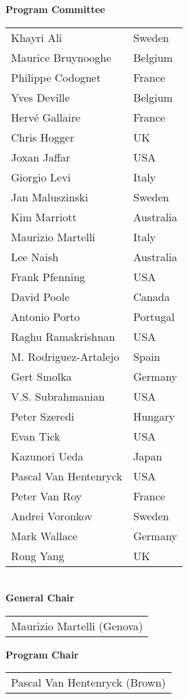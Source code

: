 \parbox{2.3in}{
{\center\bf Program Committee} \\ 
\noindent\begin{tabular}{ll}
Khayri Ali         & Sweden  \\
Maurice Bruynooghe & Belgium \\
Philippe Codognet  & France \\
Yves Deville       & Belgium \\
Herv\'{e} Gallaire & France \\
Chris Hogger       & UK \\
Joxan Jaffar       & USA \\
Giorgio Levi       & Italy \\
Jan Maluszinski    & Sweden \\
Kim Marriott       & Australia \\
Maurizio Martelli  & Italy \\
Lee Naish          & Australia \\
Frank Pfenning     & USA \\
David Poole        & Canada \\
Antonio Porto      & Portugal \\
Raghu Ramakrishnan & USA \\
M. Rodriguez-Artalejo & Spain \\
Gert Smolka	   & Germany \\
V.S. Subrahmanian  & USA \\
Peter Szeredi      & Hungary \\
Evan Tick          & USA \\
Kazunori Ueda      & Japan \\
Pascal Van Hentenryck & USA \\
Peter Van Roy      & France \\
Andrei Voronkov    & Sweden \\
Mark Wallace       & Germany \\
Rong Yang          & UK \\
\end{tabular}
\\
{\center\bf General Chair} \\ 
\begin{tabular}{l}
Maurizio Martelli (Genova) \\
\end{tabular}
%
{\center\bf Program Chair} \\ 
\begin{tabular}{l}
Pascal Van Hentenryck (Brown) \\

\end{tabular}}
